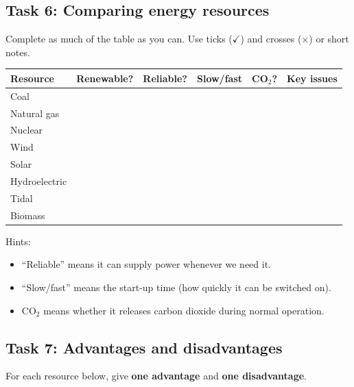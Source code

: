 \documentclass[11pt,a4paper]{article}
\begin{document}
\newpage

\subsection*{Task 6: Comparing energy resources}

Complete as much of the table as you can. Use ticks ($\checkmark$) and crosses ($\times$) or short notes.

\begin{center}
\begin{tabular}{|l|c|c|c|c|c|}
\hline
\textbf{Resource} & \textbf{Renewable?} & \textbf{Reliable?} & \textbf{Slow/fast} & \textbf{CO$_2$?} & \textbf{Key issues} \\
\hline
Coal & & & & & \\
\hline
Natural gas & & & & & \\
\hline
Nuclear & & & & & \\
\hline
Wind & & & & & \\
\hline
Solar & & & & & \\
\hline
Hydroelectric & & & & & \\
\hline
Tidal & & & & & \\
\hline
Biomass & & & & & \\
\hline
\end{tabular}
\end{center}

Hints:
\begin{itemize}[noitemsep]
    \item ``Reliable'' means it can supply power whenever we need it.
    \item ``Slow/fast'' means the start-up time (how quickly it can be switched on).
    \item CO$_2$ means whether it releases carbon dioxide during normal operation.
\end{itemize}

\vspace{0.5cm}

\subsection*{Task 7: Advantages and disadvantages}

For each resource below, give \textbf{one advantage} and \textbf{one disadvantage}.
\end{document}
